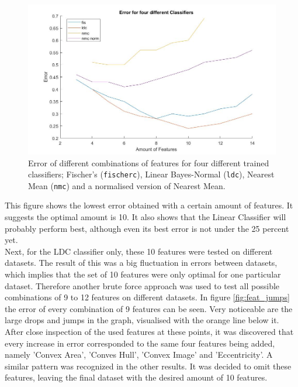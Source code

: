 \begin{figure}[H]
	\centering
	\includegraphics[scale=0.45]{images/feat_bf_error.jpg}
	\caption{Error of different combinations of features for four different trained classifiers; Fischer's (\texttt{fischerc}), Linear Bayes-Normal (\texttt{ldc}), Nearest Mean (\texttt{nmc}) and a normalised version of Nearest Mean.}
	\label{fig:feat_bf_error}
\end{figure}
\noindent This figure shows the lowest error obtained with a certain amount of features. It suggests the optimal amount is 10. It also shows that the Linear Classifier will probably perform best, although even its best error is not under the 25 percent yet. \\
Next, for the LDC classifier only, these 10 features were tested on different datasets. The result of this was a big fluctuation in errors between datasets, which implies that the set of 10 features were only optimal for one particular dataset. Therefore another brute force approach was used to test all possible combinations of 9 to 12 features on different datasets. In figure \ref{fig:feat_jumps} the error of every combination of 9 features can be seen. Very noticeable are the large drops and jumps in the graph, visualised with the orange line below it. After close inspection of the used features at these points, it was discovered that every increase in error corresponded to the same four features being added, namely 'Convex Area', 'Conves Hull', 'Convex Image' and 'Eccentricity'. A similar pattern was recognized in the other results. It was decided to omit these features, leaving the final dataset with the desired amount of 10 features.
